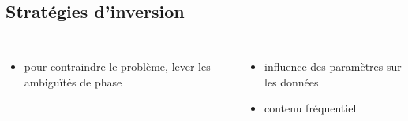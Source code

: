 \subsection{Stratégies d'inversion}
\begin{frame}{\insertsubsectionhead}
\begin{small}
	\begin{columns}
	\begin{itemize}
		\item pour contraindre le problème,  lever les ambiguïtés de phase
	\end{itemize}
	\begin{itemize}
		\item<2-> influence des paramètres sur les données %
		\item<4-> contenu fréquentiel
	\end{itemize}
		\centering
		\vspace{-0.5cm}
\end{columns}
\end{small}
\end{frame}
